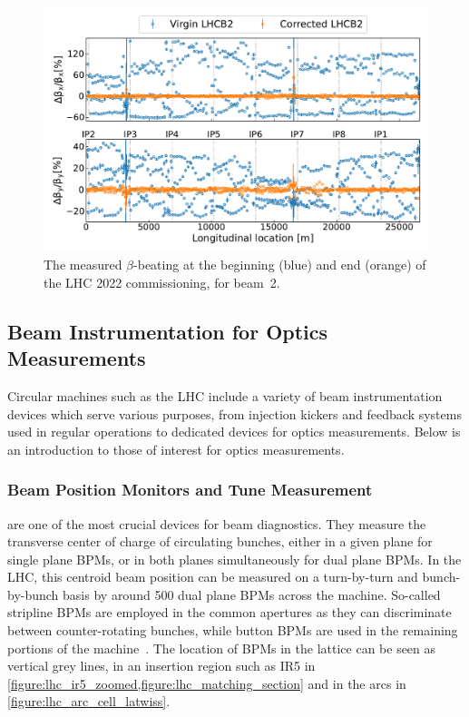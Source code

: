 \begin{figure}[!hbt]
  \centering
  \includegraphics*[width=\linewidth]{Figures/Optics_Measurements_Corrections_at_LHC/virgin_vs_commissionned_lhcb2.pdf}
  \caption{The measured \(\beta\)-beating at the beginning (\textcolor{mplblue}{blue}) and end (\textcolor{mplorange}{orange}) of the LHC \num{2022} commissioning, for beam~\num{2}.}
  \label{figure:virgin_vs_corrected_lhcb2}
\end{figure}

\subsection{Beam Instrumentation for Optics Measurements}
\label{subsection:beam_instrumentation_for_optics_measurements}

Circular machines such as the LHC include a variety of beam instrumentation devices which serve various purposes, from injection kickers and feedback systems used in regular operations to dedicated devices for optics measurements.
Below is an introduction to those of interest for optics measurements.

\subsubsection*{Beam Position Monitors and Tune Measurement}

 are one of the most crucial devices for beam diagnostics.
They measure the transverse center of charge of circulating bunches, either in a given plane for single plane BPMs, or in both planes simultaneously for dual plane BPMs.
In the \gls{LHC}, this centroid beam position can be measured on a turn-by-turn and bunch-by-bunch basis by around \num{500} dual plane \glspl{BPM} across the machine.
So-called stripline BPMs are employed in the common apertures as they can discriminate between counter-rotating bunches, while button BPMs are used in the remaining portions of the machine~\cite{BOOK:Bruning:LHC_Design_Report_Main_Ring}. 
The location of BPMs in the lattice can be seen as vertical grey lines, in an insertion region such as IR\num{5} in \cref{figure:lhc_ir5_zoomed,figure:lhc_matching_section} and in the arcs in \cref{figure:lhc_arc_cell_latwiss}.

